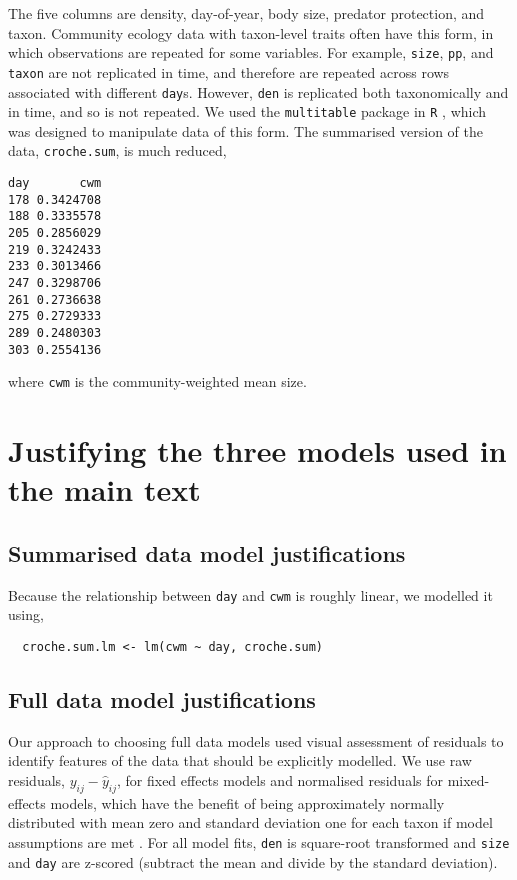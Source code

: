 \documentclass[12pt]{ecologyFORAPPENDIX}
\begin{document}
\noindent The five columns are density, day-of-year, body size, predator protection, and taxon.  Community ecology data with taxon-level traits often have this form, in which observations are repeated for some variables.  For example, \texttt{size}, \texttt{pp}, and \texttt{taxon} are not replicated in time, and therefore are repeated across rows associated with different \texttt{day}s.  However, \texttt{den} is replicated both taxonomically and in time, and so is not repeated.  We used the \texttt{multitable} package in \texttt{R} \citep{Walker2012}, which was designed to manipulate data of this form.  The summarised version of the data, \texttt{croche.sum}, is much reduced,

\vspace{-18pt}
\singlespace
\begin{verbatim}
day       cwm
178 0.3424708
188 0.3335578
205 0.2856029
219 0.3242433
233 0.3013466
247 0.3298706
261 0.2736638
275 0.2729333
289 0.2480303
303 0.2554136
\end{verbatim}
\doublespace
where \texttt{cwm} is the community-weighted mean size.

\section{Justifying the three models used in the main text}

\subsection{Summarised data model justifications}

Because the relationship between \texttt{day} and \texttt{cwm} is roughly linear, we modelled it using,
\vspace{-18pt}
\singlespace
\begin{verbatim}
  croche.sum.lm <- lm(cwm ~ day, croche.sum)
\end{verbatim}
\doublespace

\subsection{Full data model justifications}

Our approach to choosing full data models used visual assessment of residuals to identify features of the data that should be explicitly modelled.  We use raw residuals, $y_{ij} - \hat{y}_{ij}$, for fixed effects models and normalised residuals for mixed-effects models, which have the benefit of being approximately normally distributed with mean zero and standard deviation one for each taxon if model assumptions are met \citep{PinheiroAndBates2000}.  For all model fits, \texttt{den} is square-root transformed and \texttt{size} and \texttt{day} are z-scored (subtract the mean and divide by the standard deviation).
\end{document}
